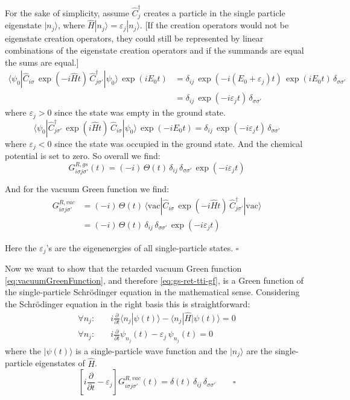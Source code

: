 For the sake of simplicity, assume $\hat{C}_j^{\dagger}$ creates a particle in the single particle eigenstate $|n_j\rangle$, where $\hat{H} |n_j\rangle = \varepsilon_j |n_j\rangle$.
[If the creation operators would not be eigenstate creation operators, they could still be represented by linear combinations of the eigenstate creation operators and if the summands are equal the sums are equal.]
\begin{align*}
    \langle \psi_0 | \hat{C}_{i\sigma}\, \exp(-i\hat{H}t)\, \hat{C}_{j\sigma'}^{\dagger} | \psi_0 \rangle\, \exp(i E_0 t) &= \delta_{ij}\, \exp(-i(E_0 + \varepsilon_j)t)\, \exp(i E_0 t)\, \delta_{\sigma\sigma'} \\
    &= \delta_{ij}\, \exp(-i \varepsilon_j t)\, \delta_{\sigma\sigma'}
\end{align*}
where $\varepsilon_j > 0$ since the state was empty in the ground state.
\begin{equation*}
    \langle \psi_0 | \hat{C}_{j\sigma'}^{\dagger}\, \exp(i\hat{H}t)\, \hat{C}_{i\sigma} | \psi_0 \rangle\, \exp(-i E_0 t) = \delta_{ij}\, \exp(-i \varepsilon_j t)\, \delta_{\sigma\sigma'}
\end{equation*}
where $\varepsilon_j < 0$ since the state was occupied in the ground state. And the chemical potential is set to zero.
So overall we find:
\begin{equation*}
    G^{R,gs}_{i\sigma j\sigma'}(t) = (-i)\, \Theta(t)\, \delta_{ij}\, \delta_{\sigma\sigma'}\, \exp(-i \varepsilon_j t)
\end{equation*}

And for the vacuum Green function we find:
\begin{align*}
    G^{R,vac}_{i\sigma j\sigma'} &= (-i)\, \Theta(t)\, \langle \text{vac} | \hat{C}_{i\sigma}\, \exp(-i\hat{H}t)\, \hat{C}_{j\sigma'}^{\dagger} | \text{vac} \rangle \\
    &= (-i)\, \Theta(t)\, \delta_{ij}\, \delta_{\sigma\sigma'}\, \exp(-i \varepsilon_j t)
\end{align*}

Here the $\varepsilon_j$'s are the eigenenergies of all single-particle states. $\square$

Now we want to show that the retarded vacuum Green function \ref{eq:vacuumGreenFunction}, and therefore \ref{eq:gs-ret-tti-gf}, is a Green function of the
single-particle Schrödinger equation in the mathematical sense. Considering the Schrödinger equation in the right basis this is straightforward:
\begin{align*}
    \forall n_j: \quad & i \frac{\partial}{\partial t} \langle n_j | \psi(t) \rangle - \langle n_j | \hat{H} | \psi(t) \rangle = 0 \\
    \forall n_j: \quad & i \frac{\partial}{\partial t} \psi_{n_j}(t) - \varepsilon_j\, \psi_{n_j}(t) = 0
\end{align*}
where the $|\psi(t)\rangle$ is a single-particle wave function and the $|n_j\rangle$ are the single-particle eigenstates of $\hat{H}$.
\begin{equation*}
    \left[ i \frac{\partial}{\partial t} - \varepsilon_j \right] G^{R,vac}_{i\sigma j\sigma'}(t) = \delta(t)\, \delta_{ij}\, \delta_{\sigma\sigma'} \qquad \square
\end{equation*}

